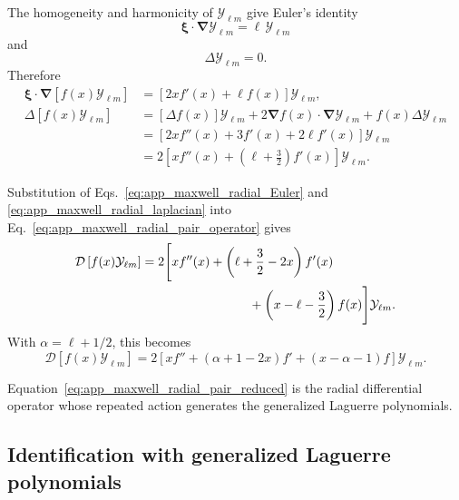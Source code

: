 \documentclass[11pt,oneside]{article}
\numberwithin{equation}{section}
\theoremstyle{definition}
\begin{document}
The homogeneity and harmonicity of $\mathcal Y_{\ell m}$ give
Euler's identity
\begin{equation}
\bm\xi\cdot\bm\nabla
\mathcal Y_{\ell m}
=
\ell\,\mathcal Y_{\ell m}
\label{eq:app_maxwell_Euler_solid}
\end{equation}
and
\begin{equation}
\Delta\mathcal Y_{\ell m}=0.
\end{equation}
Therefore
\begin{align}
\bm\xi\cdot\bm\nabla
\left[
f(x)\mathcal Y_{\ell m}
\right]
&=
\left[
2x f'(x)+\ell f(x)
\right]
\mathcal Y_{\ell m},
\label{eq:app_maxwell_radial_Euler}
\\
\Delta
\left[
f(x)\mathcal Y_{\ell m}
\right]
&=
\left[
\Delta f(x)
\right]\mathcal Y_{\ell m}
+
2\bm\nabla f(x)\cdot
\bm\nabla\mathcal Y_{\ell m}
+
f(x)\Delta\mathcal Y_{\ell m}
\nonumber\\
&=
\left[
2x f''(x)
+
3f'(x)
+
2\ell f'(x)
\right]
\mathcal Y_{\ell m}
\nonumber\\
&=
2
\left[
x f''(x)
+
\left(\ell+\frac32\right)f'(x)
\right]
\mathcal Y_{\ell m}.
\label{eq:app_maxwell_radial_laplacian}
\end{align}

Substitution of Eqs.~\eqref{eq:app_maxwell_radial_Euler} and
\eqref{eq:app_maxwell_radial_laplacian} into
Eq.~\eqref{eq:app_maxwell_radial_pair_operator} gives
\begin{align}
\mathcal D
\left[
f(x)\mathcal Y_{\ell m}
\right]
&=
2
\Bigg[
x f''(x)
+
\left(
\ell+\frac32-2x
\right)f'(x)
\nonumber\\
&\hspace{30mm}
+
\left(
x-\ell-\frac32
\right)f(x)
\Bigg]
\mathcal Y_{\ell m}.
\end{align}
With $\alpha=\ell+1/2$, this becomes
\begin{equation}
\mathcal D
\left[
f(x)\mathcal Y_{\ell m}
\right]
=
2
\left[
x f''
+
(\alpha+1-2x)f'
+
(x-\alpha-1)f
\right]
\mathcal Y_{\ell m}.
\label{eq:app_maxwell_radial_pair_reduced}
\end{equation}

Equation~\eqref{eq:app_maxwell_radial_pair_reduced} is the radial
differential operator whose repeated action generates the generalized
Laguerre polynomials.

\subsection{Identification with generalized Laguerre polynomials}
\end{document}
